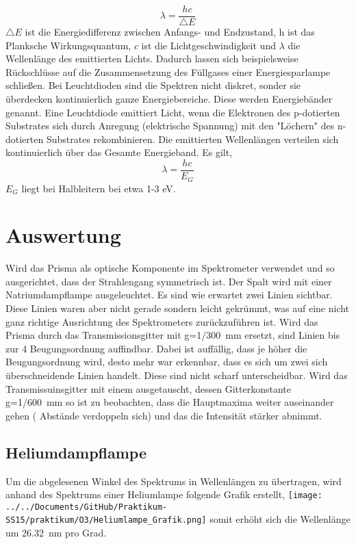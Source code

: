 \begin{equation}
\lambda=\frac{hc}{\triangle E}
\end{equation}
$ \triangle E $ ist die Energiedifferenz zwischen Anfangs- und Endzustand, $ \textit{h} $ ist das Planksche Wirkungsquantum, $ \textit{c} $ ist die Lichtgeschwindigkeit und $ \lambda $ die Wellenlänge des emittierten Lichts. 
Dadurch lassen sich beispielsweise Rückschlüsse auf die Zusammensetzung des Füllgases einer Energiesparlampe schließen.
Bei Leuchtdioden sind die Spektren nicht diskret, sonder sie überdecken kontinuierlich ganze Energiebereiche. Diese werden Energiebänder genannt. 
Eine Leuchtdiode emittiert Licht, wenn die Elektronen des p-dotierten Substrates sich durch Anregung (elektrische Spannung) mit den "Löchern" des n-dotierten Substrates rekombinieren. Die emittierten Wellenlängen verteilen sich kontinuierlich über das Gesamte Energieband. Es gilt,
\begin{equation}
\lambda=\frac{hc}{E_{G}}
\end{equation}
$ E_{G} $ liegt bei Halbleitern bei etwa 1-3 eV.

\newpage
\section{Auswertung}
Wird das Prisma als optische Komponente im Spektrometer verwendet und so ausgerichtet, dass der Strahlengang symmetrisch ist. Der Spalt wird mit einer  Natriumdampflampe ausgeleuchtet. Es sind wie erwartet zwei Linien sichtbar. Diese Linien waren aber nicht gerade sondern leicht gekrümmt, was auf eine nicht ganz richtige Ausrichtung des Spektrometers zurückzuführen ist.
Wird das Prisma durch das Transmissionsgitter mit  g=\SI{1/300}{\milli\meter}  ersetzt, sind Linien bis zur 4 Beugungsordnung auffindbar. Dabei ist auffällig, dass je höher die Beugungsordnung wird, desto mehr war erkennbar, dass es sich um zwei sich überschneidende Linien handelt. Diese sind nicht scharf unterscheidbar.
Wird das Transmissuinsgitter mit einem ausgetauscht, dessen Gitterkonstante  g=\SI{1/600}{\milli\meter}  so ist zu beobachten, dass die Hauptmaxima weiter auseinander gehen ( Abstände verdoppeln sich) und das die Intensität stärker abnimmt.
\subsection{Heliumdampflampe}
Um die abgelesenen Winkel des Spektrums in Wellenlängen zu übertragen, wird anhand des Spektrums einer Heliumlampe folgende Grafik erstellt,
\texttt{[image: ../../Documents/GitHub/Praktikum-SS15/praktikum/O3/Heliumlampe\_Grafik.png]} 
somit erhöht sich die Wellenlänge um \SI{26,32}{\nano\meter} pro Grad.

